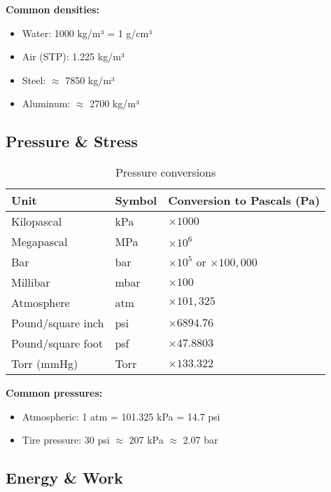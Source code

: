 \textbf{Common densities:}
\begin{itemize}
    \item Water: 1000 kg/m³ = 1 g/cm³
    \item Air (STP): 1.225 kg/m³
    \item Steel: $\approx$ 7850 kg/m³
    \item Aluminum: $\approx$ 2700 kg/m³
\end{itemize}

\subsection{Pressure \& Stress}

\begin{table}[H]
\centering
\begin{tabular}{|l|l|l|}
\hline
\rowcolor{blue!20}
\textbf{Unit} & \textbf{Symbol} & \textbf{Conversion to Pascals (Pa)} \\
\hline
Kilopascal & kPa & $\times 1000$ \\
\hline
Megapascal & MPa & $\times 10^{6}$ \\
\hline
Bar & bar & $\times 10^{5}$ or $\times 100{,}000$ \\
\hline
Millibar & mbar & $\times 100$ \\
\hline
Atmosphere & atm & $\times 101{,}325$ \\
\hline
\rowcolor{yellow!20}
Pound/square inch & psi & $\times 6894.76$ \\
\hline
\rowcolor{yellow!20}
Pound/square foot & psf & $\times 47.8803$ \\
\hline
Torr (mmHg) & Torr & $\times 133.322$ \\
\hline
\end{tabular}
\caption{Pressure conversions}
\end{table}

\textbf{Common pressures:}
\begin{itemize}
    \item Atmospheric: 1 atm = 101.325 kPa = 14.7 psi
    \item Tire pressure: 30 psi $\approx$ 207 kPa $\approx$ 2.07 bar
\end{itemize}

\subsection{Energy \& Work}

